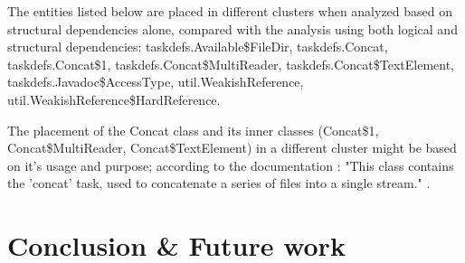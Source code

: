 \documentclass[conference]{IEEEtran}
\begin{document}
The entities listed below are placed in different clusters when analyzed based on structural dependencies alone, compared with the analysis using both logical and structural dependencies: taskdefs.Available\$FileDir, taskdefs.Concat, taskdefs.Concat\$1, taskdefs.Concat\$MultiReader, taskdefs.Concat\$TextElement, taskdefs.Javadoc\$AccessType, util.WeakishReference, util.WeakishReference\$HardReference.

The placement of the Concat class and its inner classes (Concat\$1, Concat\$MultiReader, Concat\$TextElement) in a different cluster might be based on it's usage and purpose; according to the documentation : "This class contains the 'concat' task, used to concatenate a series of files into a single stream." \cite{ant_concat}.

\section{Conclusion & Future work}




\end{document}
